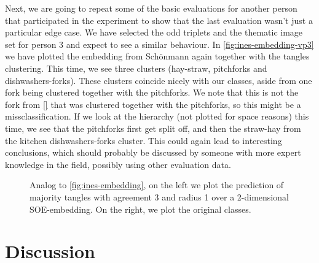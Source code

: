 Next, we are going to repeat some of the basic evaluations for another person that participated in the experiment to show that the last evaluation wasn't just a particular edge case.
We have selected the odd triplets and the thematic image set for person 3 and expect to see a similar behaviour. In \autoref{fig:ines-embedding-vp3} we have plotted the embedding
from Schönmann again together with the tangles clustering. This time, we see three clusters (hay-straw, pitchforks and dishwashers-forks). These clusters coincide nicely
with our classes, aside from one fork being clustered together with the pitchforks. We note that this is not the fork from \autoref{} that was clustered together with the pitchforks, 
so this might be a missclassification. If we look at the hierarchy (not plotted for space reasons) this time, we see that the pitchforks first get split off, and then the straw-hay from the kitchen dishwashers-forks cluster.
This could again lead to interesting conclusions, which should probably be discussed by someone with more expert knowledge in the field, possibly using other evaluation data.

\onecolumn
\begin{figure}[ht]
    \centering
    \caption{
        Analog to \autoref{fig:ines-embedding}, on the left we plot the prediction of majority tangles with agreement 3 and radius 1 over 
        a 2-dimensional SOE-embedding. On the right, we plot the original classes.
    }
    \label{fig:ines-embedding-vp3}
\end{figure}


\section{Discussion}



